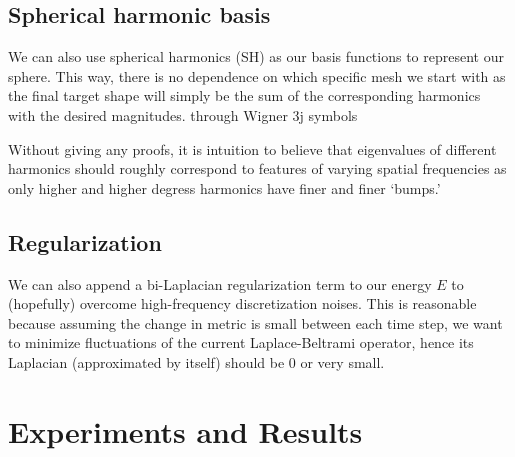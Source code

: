 \documentclass[11pt]{article}
\theoremstyle{definition}
\begin{document}
\subsection{Spherical harmonic basis}

We can also use spherical harmonics (SH) as our basis functions to represent our sphere. This way, there is no dependence on which specific mesh we start with as the final target shape will simply be the sum of the corresponding harmonics with the desired magnitudes. through Wigner 3j symbols 

Without giving any proofs, it is intuition to believe that eigenvalues of different harmonics should roughly correspond to features of varying spatial frequencies as only higher and higher degress harmonics have finer and finer `bumps.'

\subsection{Regularization}
We can also append a bi-Laplacian regularization term to our energy $E$ to (hopefully) overcome high-frequency discretization noises. This is reasonable because assuming the change in metric is small between each time step, we want to minimize fluctuations of the current Laplace-Beltrami operator, hence its Laplacian (approximated by itself) should be $0$ or very small.

\section{Experiments and Results}
\end{document}
